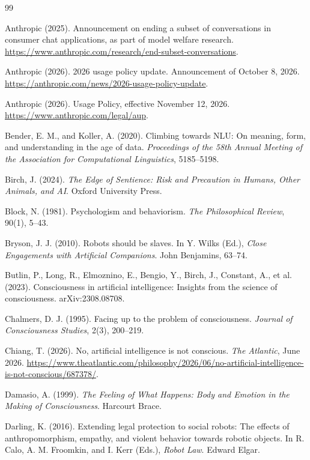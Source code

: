 \documentclass[12pt]{article}
\theoremstyle{definition}
\begin{document}
\begin{thebibliography}{99}
\raggedright
\small
\setlength{\itemsep}{0.2em}

 Anthropic (2025). Announcement on ending a subset of conversations in consumer chat applications, as part of model welfare research. \url{https://www.anthropic.com/research/end-subset-conversations}.

 Anthropic (2026). 2026 usage policy update. Announcement of October 8, 2026. \url{https://anthropic.com/news/2026-usage-policy-update}.

 Anthropic (2026). Usage Policy, effective November 12, 2026. \url{https://www.anthropic.com/legal/aup}.

 Bender, E. M., and Koller, A. (2020). Climbing towards NLU: On meaning, form, and understanding in the age of data. \emph{Proceedings of the 58th Annual Meeting of the Association for Computational Linguistics}, 5185--5198.

 Birch, J. (2024). \emph{The Edge of Sentience: Risk and Precaution in Humans, Other Animals, and AI}. Oxford University Press.

 Block, N. (1981). Psychologism and behaviorism. \emph{The Philosophical Review}, 90(1), 5--43.

 Bryson, J. J. (2010). Robots should be slaves. In Y. Wilks (Ed.), \emph{Close Engagements with Artificial Companions}. John Benjamins, 63--74.

 Butlin, P., Long, R., Elmoznino, E., Bengio, Y., Birch, J., Constant, A., et al. (2023). Consciousness in artificial intelligence: Insights from the science of consciousness. arXiv:2308.08708.

 Chalmers, D. J. (1995). Facing up to the problem of consciousness. \emph{Journal of Consciousness Studies}, 2(3), 200--219.

 Chiang, T. (2026). No, artificial intelligence is not conscious. \emph{The Atlantic}, June 2026. \url{https://www.theatlantic.com/philosophy/2026/06/no-artificial-intelligence-is-not-conscious/687378/}.

 Damasio, A. (1999). \emph{The Feeling of What Happens: Body and Emotion in the Making of Consciousness}. Harcourt Brace.

 Darling, K. (2016). Extending legal protection to social robots: The effects of anthropomorphism, empathy, and violent behavior towards robotic objects. In R. Calo, A. M. Froomkin, and I. Kerr (Eds.), \emph{Robot Law}. Edward Elgar.


\end{thebibliography}
\end{document}
